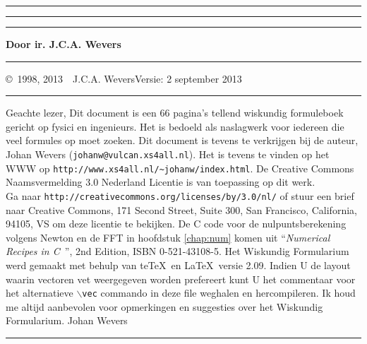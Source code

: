 \pagestyle{fancyplain}
\cfoot{\fancyplain{\thepage}{}}

\thispagestyle{empty}
\hrule
\rule{.4pt}{22.35cm}\hspace*{161.62mm}\rule{.4pt}{22.35cm}
\vspace*{-17cm}
\begin{center}
\Huge
{}
\end{center}
\vspace{2cm}
\centerline{\Large\bf Door ir. J.C.A. Wevers}
\vfill
\hrule
\newpage
\thispagestyle{empty}
\copyright~1998, 2013~~J.C.A. Wevers\hfill Versie: 2 september 2013
\npar
\hrule
\par
\bigskip
Geachte lezer,
\npar
Dit document is een 66 pagina's tellend wiskundig formuleboek gericht
op fysici en ingenieurs. Het is bedoeld als naslagwerk voor iedereen die
veel formules op moet zoeken.
\npar
Dit document is tevens te verkrijgen bij de auteur, Johan Wevers ({\tt johanw@vulcan.xs4all.nl}).
\npar
Het is tevens te vinden op het WWW op {\tt http://www.xs4all.nl/\~{}johanw/index.html}.
\npar
De Creative Commons Naamsvermelding 3.0 Nederland Licentie is van toepassing op dit werk.\\
Ga naar {\tt http://creativecommons.org/licenses/by/3.0/nl/} of stuur een brief naar Creative Commons, 171 Second Street, Suite 300, San Francisco, California, 94105, VS om deze licentie te bekijken.
\npar
De C code voor de nulpuntsberekening volgens Newton en de FFT in hoofdstuk
\ref{chap:num} komen uit ``{\it Numerical Recipes in C}~'', 2nd Edition,
ISBN 0-521-43108-5.
\npar
Het Wiskundig Formularium werd gemaakt met behulp van te\TeX\ en \LaTeX\ versie 2.09.
\npar
Indien U de layout waarin vectoren vet weergegeven worden prefereert kunt U
het commentaar voor het alternatieve {\tt $\backslash$vec} commando in deze
file weghalen en hercompileren.
\npar
Ik houd me altijd aanbevolen voor opmerkingen en suggesties over het
Wiskundig Formularium.
\npar
Johan Wevers
\vfill
\hrule

\newpage

\tableofcontents
\cleardoublepage


\renewcommand{\chaptermark}[1]{\markboth{#1}{#1}}

